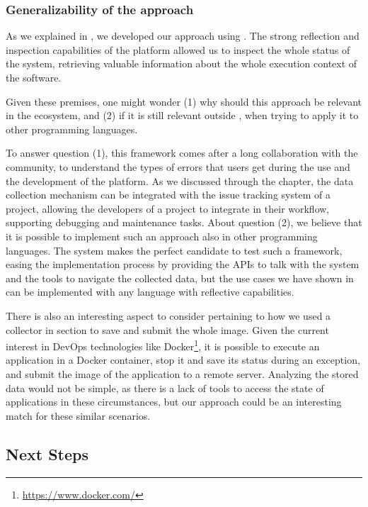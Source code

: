 \subsubsection{Generalizability of the approach}

As we explained in , we developed our approach using \pha.
The strong reflection and inspection capabilities of the platform allowed us to inspect the whole status of the system, retrieving valuable information about the whole execution context of the software.

Given these premises, one might wonder (1) why should this approach be relevant in the \pha ecosystem, and (2) if it is still relevant outside \pha, when trying to apply it to other programming languages.

To answer question (1), this framework comes after a long collaboration with the \pha community, to understand the types of errors that users get during the use and the development of the platform.
As we discussed through the chapter, the data collection mechanism can be integrated with the issue tracking system of a project, allowing the developers of a project to integrate \sln in their workflow, supporting debugging and maintenance tasks.
About question (2), we believe that it is possible to implement such an approach also in other programming languages.
The \pha system makes the perfect candidate to test such a framework, easing the implementation process by providing the APIs to talk with the system and the tools to navigate the collected data, but the use cases we have shown in  can be implemented with any language with reflective capabilities.

There is also an interesting aspect to consider pertaining to how we used a collector in section  to save and submit the whole \pha image.
Given the current interest in DevOps technologies like Docker\footnote{\url{https://www.docker.com/}}, it is possible to execute an application in a Docker container, stop it and save its status during an exception, and submit the image of the application to a remote server.
Analyzing the stored data would not be simple, as there is a lack of tools to access the state of applications in these circumstances, but our approach could be an interesting match for these similar scenarios.


\subsection{Next Steps}

